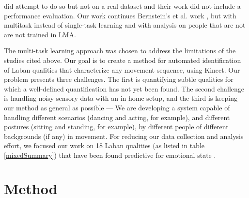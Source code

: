 \documentclass[11pt,twocolumn,varwidth=true,a4paper,fleqn]{sigchi}
\begin{document}
\cite{kim} did attempt to do so but not on a real dataset and their work did not include a performance evaluation. Our work continues Bernstein's et al. work \cite{ran}, but with multitask instead of single-task learning and with analysis on people that are not are not trained in LMA.
\mbox{}\\
\par
The multi-task learning approach was chosen to address the limitations of the studies cited above. Our goal is to create a method for automated identification of Laban qualities that
characterize any movement sequence, using Kinect.
Our problem presents three challenges. The first is
quantifying subtle qualities for which a well-defined quantification has not yet been found.
The second challenge is handling noisy sensory data with an in-home setup, and the
third is keeping our method as general as possible --- We are developing a system capable of
handling different scenarios (dancing and acting, for example), and different postures (sitting and standing, for example), by different people of different backgrounds (if any)
in movement. For reducing our data collection and analysis effort, we focused our work on 18 Laban qualities
(as listed in table \ref{mixedSummary}) that have been found predictive for emotional state \cite{Tsachor}.

\section{Method}
\end{document}
